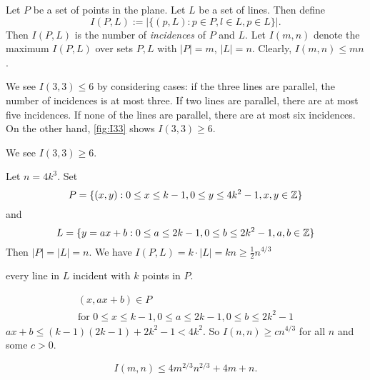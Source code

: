 Let $P$ be a set of points in the plane. Let $L$ be a set of lines. Then define
\[
I(P,L):= |\{ ( p,L ): p\in P, l\in L, p\in L \}|.
\]
Then $I(P,L)$ is the number of \emph{incidences} of $P$ and $L$. Let $I(m,n)$ denote the maximum $I(P,L)$ over sets $P,L$ with $|P| = m$, $|L| = n$. Clearly, $I(m,n)\leq mn$.
\begin{example} We see $I(3,3) \leq 6$ by considering cases: if the three lines are parallel, the number of incidences is at most three. If two lines are parallel, there are at most five incidences. If none of the lines are parallel, there are at most six incidences. On the other hand, \cref{fig:I33} shows $I(3,3)\geq 6$.
\begin{marginfigure}
\begin{center}
\vspace{1em}
\end{center}
\caption{We see $I(3,3)\geq 6$.} \label{fig:I33}
\end{marginfigure}
\end{example}




\begin{example}
Let $n=4k^3$. Set
\[
P = \{ (x,y): 0\leq x \leq k-1, 0 \leq y\leq 4k^2 - 1, x,y\in \mathbb{Z}\}
\]
and 
\[
L = \{ y = ax+b: 0\leq a \leq 2k-1, 0\leq b\leq 2k^2-1, a,b\in \mathbb{Z} \}
\]
Then $|P| = |L| =n$. We have $I(P,L)= k \cdot |L|  = kn \geq \frac{1}{2}n^{4/3}$

every line in $L$ incident with $k$ points in $P$.



\begin{gather*}
(x,ax+b)\in P \\
\text{for } 0\leq x \leq k-1, 0\leq a \leq 2k-1, 0\leq b \leq 2k^2- 1
\end{gather*}
$ax+b \leq (k-1)(2k-1) + 2k^2 - 1 < 4k^2$. So $I(n,n) \geq c n^{4/3}$ for all $n$ and some $c>0$.
\end{example}

\begin{theorem} \label{thm:bound_I_m_n95} \label{thm:Szemerdi_Trotter}
\[
I(m,n) \leq 4 m^{2/3} n^{2/3} + 4m + n.
\]
\end{theorem}

